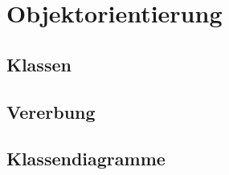 \section{Objektorientierung}
\subsection{Klassen}
\subsection{Vererbung}
\subsection{Klassendiagramme}